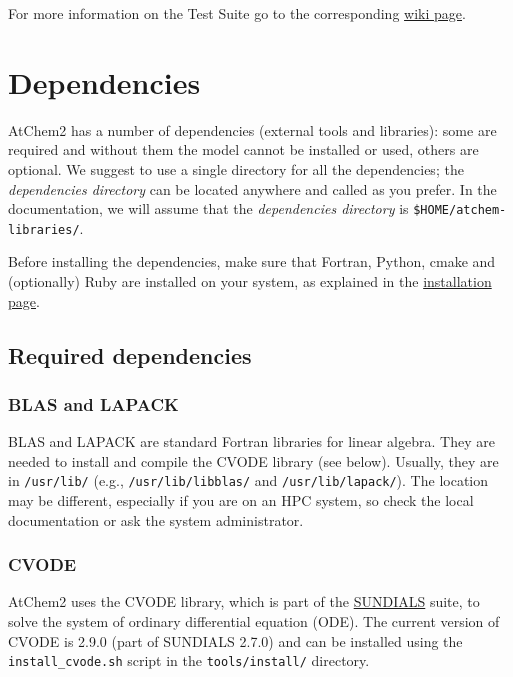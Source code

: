 For more information on the Test Suite go to the corresponding
\hyperref[sec:testsuite]{wiki page}.

\section{Dependencies} \label{sec:dependencies}

AtChem2 has a number of dependencies (external tools and libraries):
some are required and without them the model cannot be installed or
used, others are optional. We suggest to use a single directory for
all the dependencies; the \emph{dependencies directory} can be located
anywhere and called as you prefer. In the documentation, we will
assume that the \emph{dependencies directory} is
\texttt{\$HOME/atchem-libraries/}.

Before installing the dependencies, make sure that Fortran, Python,
cmake and (optionally) Ruby are installed on your system, as explained
in the \hyperref[sec:install]{installation page}.

\subsection{Required
  dependencies} \label{subsec:required-dependencies}

\subsubsection{BLAS and LAPACK} \label{blas-and-lapack}

BLAS and LAPACK are standard Fortran libraries for linear
algebra. They are needed to install and compile the CVODE library (see
below).  Usually, they are in \texttt{/usr/lib/} (e.g.,
\texttt{/usr/lib/libblas/} and \texttt{/usr/lib/lapack/}). The
location may be different, especially if you are on an HPC system, so
check the local documentation or ask the system administrator.

\subsubsection{CVODE} \label{cvode}

AtChem2 uses the CVODE library, which is part of the
\href{https://computation.llnl.gov/projects/sundials}{SUNDIALS} suite,
to solve the system of ordinary differential equation (ODE). The
current version of CVODE is 2.9.0 (part of SUNDIALS 2.7.0) and can be
installed using the \texttt{install\_cvode.sh} script in the
\texttt{tools/install/} directory.

